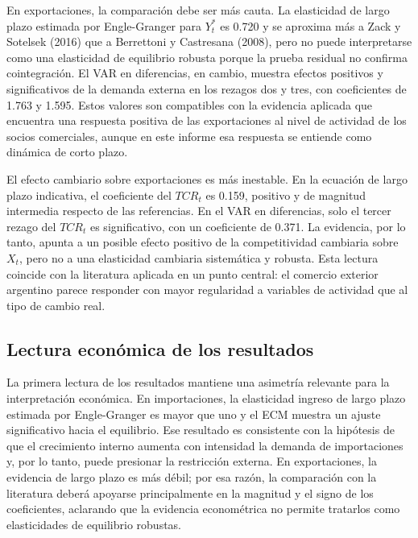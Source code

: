 \documentclass[11pt,a4paper]{article}
\begin{document}
	En exportaciones, la comparación debe ser más cauta. La elasticidad de largo
	plazo estimada por Engle-Granger para \(Y_t^*\) es 0.720 y se aproxima más a
	Zack y Sotelsek (2016) que a Berrettoni y Castresana (2008), pero no puede
	interpretarse como una elasticidad de equilibrio robusta porque la prueba
	residual no confirma cointegración. El VAR en diferencias, en cambio, muestra
	efectos positivos y significativos de la demanda externa en los rezagos dos y
	tres, con coeficientes de 1.763 y 1.595. Estos valores son compatibles con la
	evidencia aplicada que encuentra una respuesta positiva de las exportaciones al
	nivel de actividad de los socios comerciales, aunque en este informe esa
	respuesta se entiende como dinámica de corto plazo.

	El efecto cambiario sobre exportaciones es más inestable. En la ecuación de
	largo plazo indicativa, el coeficiente del \(TCR_t\) es 0.159, positivo y de
	magnitud intermedia respecto de las referencias. En el VAR en diferencias, solo
	el tercer rezago del \(TCR_t\) es significativo, con un coeficiente de 0.371.
	La evidencia, por lo tanto, apunta a un posible efecto positivo de la
	competitividad cambiaria sobre \(X_t\), pero no a una elasticidad cambiaria
	sistemática y robusta. Esta lectura coincide con la literatura aplicada en un
	punto central: el comercio exterior argentino parece responder con mayor
	regularidad a variables de actividad que al tipo de cambio real.

	\subsection{Lectura económica de los resultados}
	\label{subsec:comparacion-lectura-economica}

	La primera lectura de los resultados mantiene una asimetría relevante para la
	interpretación económica. En importaciones, la elasticidad ingreso de largo
	plazo estimada por Engle-Granger es mayor que uno y el ECM muestra un ajuste
	significativo hacia el equilibrio. Ese resultado es consistente con la hipótesis
	de que el crecimiento interno aumenta con intensidad la demanda de importaciones
	y, por lo tanto, puede presionar la restricción externa. En exportaciones, la
	evidencia de largo plazo es más débil; por esa razón, la comparación con la
	literatura deberá apoyarse principalmente en la magnitud y el signo de los
	coeficientes, aclarando que la evidencia econométrica no permite tratarlos como
	elasticidades de equilibrio robustas.
\end{document}
